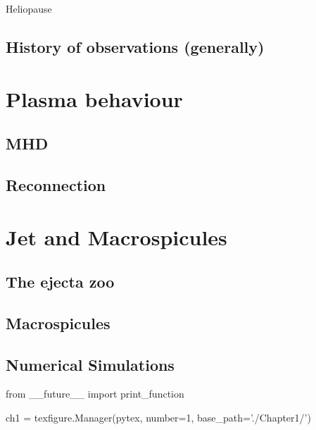 Heliopause

\subsection{History of observations (generally)}

\section{Plasma behaviour}

\subsection{MHD}

\subsection{Reconnection}

\section{Jet and Macrospicules}

\subsection{The ejecta zoo}

\subsection{Macrospicules}

\subsection{Numerical Simulations}
































\begin{pycode}[chapter1]
from __future__ import print_function

ch1 = texfigure.Manager(pytex, number=1, base_path='./Chapter1/')
\end{pycode}

